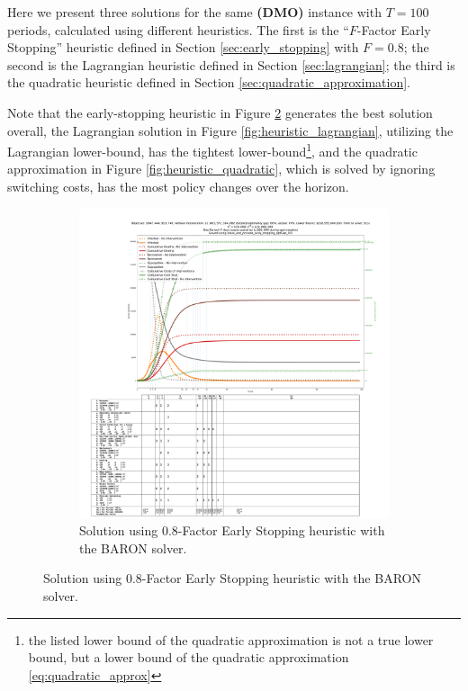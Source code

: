 \documentclass{article}
\newcommand{\model}{{\bf (DMO) }}
\begin{document}
Here we present three solutions for the same \model instance with $T=100$ periods, calculated using different heuristics. The first is the ``$F$-Factor Early Stopping'' heuristic defined in Section \ref{sec:early_stopping} with $F=0.8$; the second is the Lagrangian heuristic defined in Section \ref{sec:lagrangian}; the third is the quadratic heuristic defined in Section \ref{sec:quadratic_approximation}.

Note that the early-stopping heuristic in Figure \ref{fig:heuristic_early_stopping} generates the best solution overall, the Lagrangian solution in Figure \ref{fig:heuristic_lagrangian}, utilizing the Lagrangian lower-bound, has the tightest lower-bound\footnote{the listed lower bound of the quadratic approximation is not a true lower bound, but a lower bound of the quadratic approximation \eqref{eq:quadratic_approx}}, and the quadratic approximation in Figure \ref{fig:heuristic_quadratic}, which is solved by ignoring switching costs, has the most policy changes over the horizon.

\begin{figure}[H]
    \begin{subfigure}{\textwidth}
        \begin{center}
            \includegraphics[width=1.2\linewidth]{figures/heuristic_solutions/system_state_vs_time_T100_baron__solve_and_process_early_stopping_optGap_0.8.pdf}
        \end{center}
        \caption{Solution using $0.8$-Factor Early Stopping heuristic with the BARON solver.}\label{fig:heuristic_early_stopping}
    \end{subfigure}
\end{figure}
\end{document}
